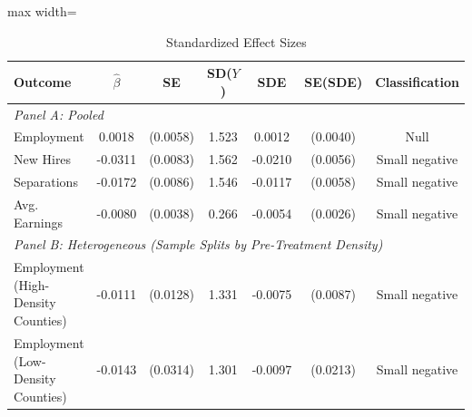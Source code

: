 \begin{table}[htbp]
\centering
\caption{Standardized Effect Sizes}
\label{tab:sde}
\begin{adjustbox}{max width=\textwidth}
\begin{tabular}{lcccccc}
\toprule
Outcome & $\hat{\beta}$ & SE & SD($Y$) & SDE & SE(SDE) & Classification \\
\midrule
\multicolumn{7}{l}{\textit{Panel A: Pooled}} \\
Employment & 0.0018 & (0.0058) & 1.523 & 0.0012 & (0.0040) & Null \\
New Hires & -0.0311 & (0.0083) & 1.562 & -0.0210 & (0.0056) & Small negative \\
Separations & -0.0172 & (0.0086) & 1.546 & -0.0117 & (0.0058) & Small negative \\
Avg. Earnings & -0.0080 & (0.0038) & 0.266 & -0.0054 & (0.0026) & Small negative \\
\midrule
\multicolumn{7}{l}{\textit{Panel B: Heterogeneous (Sample Splits by Pre-Treatment Density)}} \\
Employment (High-Density Counties) & -0.0111 & (0.0128) & 1.331 & -0.0075 & (0.0087) & Small negative \\
Employment (Low-Density Counties) & -0.0143 & (0.0314) & 1.301 & -0.0097 & (0.0213) & Small negative \\
\bottomrule
\end{tabular}
\end{adjustbox}
\begin{tablenotes}[flushleft]\small

\end{tablenotes}
\end{table}
